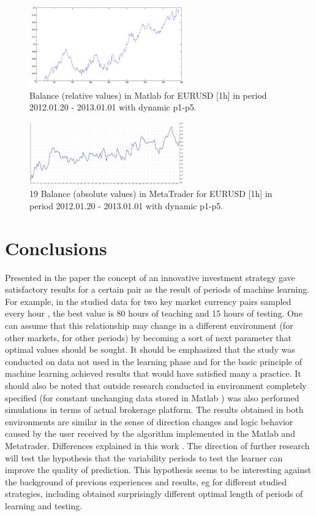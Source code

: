 \documentclass[runningheads,a4paper]{llncs}
\begin{document}
\begin{figure}[h!]
\centering
\includegraphics[width = 0.6\textwidth]{figures/rys18.png}
\caption{Balance (relative values) in Matlab for EURUSD [1h] in period 2012.01.20 - 2013.01.01 with dynamic p1-p5.}
\label{fig:fig18}
\end{figure}
\FloatBarrier
\begin{figure}[h!]
\centering
\includegraphics[width = 0.6\textwidth]{figures/rys19.png}
\caption{19 Balance (absolute values) in MetaTrader for EURUSD [1h] in period 2012.01.20 - 2013.01.01 with dynamic p1-p5.}
\label{fig:fig19}
\end{figure}
\FloatBarrier

\section{Conclusions}

Presented in the paper the concept of an innovative investment strategy gave satisfactory results for a certain pair as the result of periods of machine learning. For example, in the studied data for two key market currency pairs sampled every hour , the best value is 80 hours of teaching and 15 hours of testing. One can assume that this relationship may change in a different environment (for other markets, for other periods) by becoming a sort of next parameter that optimal values should be sought. It should be emphasized that the study was conducted on data not used in the learning phase and for the basic principle of machine learning achieved results that would have satisfied many a practice. It should also be noted that outside research conducted in environment completely specified (for constant unchanging data stored in Matlab ) was also performed simulations in terms of actual brokerage platform. The results obtained in both environments are similar in the sense of direction changes and logic behavior caused by the user received by the algorithm implemented in the Matlab and Metatrader. Differences explained in this work .
The direction of further research will test the hypothesis that the variability periods to test the learner can improve the quality of prediction. This hypothesis seems to be interesting against the background of previous experiences and results, eg for different studied strategies, including \cite{Wilinski2014} obtained surprisingly different optimal length of periods of learning and testing.





\end{document}
